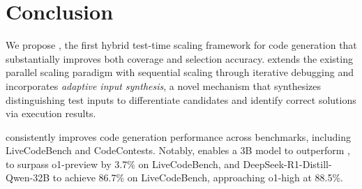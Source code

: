 \section{Conclusion}
We propose \frameworkname, the first hybrid test-time scaling framework for code generation that substantially improves both coverage and selection accuracy. \frameworkname extends the existing parallel scaling paradigm with sequential scaling through iterative debugging and incorporates \textit{adaptive input synthesis}, a novel mechanism that synthesizes distinguishing test inputs to differentiate candidates and identify correct solutions via execution results.

\frameworkname consistently improves code generation performance across benchmarks, including LiveCodeBench and CodeContests. Notably, \frameworkname enables a 3B model to outperform \fouromini, \fouromini to surpass o1-preview by 3.7\% on LiveCodeBench, and DeepSeek-R1-Distill-Qwen-32B to achieve 86.7\% on LiveCodeBench, approaching o1-high at 88.5\%.
